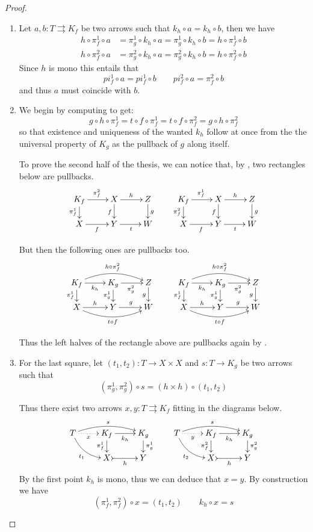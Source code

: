 \documentclass[a4paper,UKenglish,cleveref,pdftex,thm-restate,numberwithinsect]{lipics-v2021}
\begin{document}
\kpp*
\begin{proof}\label{kpp-proof}\begin{enumerate}
		\item Let $a,b\colon T\rightrightarrows K_f$ be two arrows such that $k_h\circ a=k_h\circ b$, then we have
\begin{align*}h\circ \pi^1_f\circ a&=\pi^1_g\circ k_h\circ a=\pi^1_g\circ k_h\circ b=h\circ \pi^1_f\circ b\\
	h\circ \pi^2_f\circ a&=\pi^2_g\circ k_h\circ a=\pi^2_g\circ k_h\circ b=h\circ \pi^2_f\circ b
\end{align*}
Since $h$ is mono this entails that
\[pi^1_f\circ a=pi^1_f\circ b \qquad pi^2_f\circ a=\pi^2_f\circ b\]
and thus $a$ must coincide with $b$.
 
 		\item  We begin by computing to get:
		\[g \circ h \circ \pi_f^1 =  t \circ f \circ \pi_f^1     =  t \circ f \circ \pi_f^2     =  g \circ h \circ \pi_f^2\]
		so that  existence  and uniqueness of the wanted $k_h$ follow at once from the the universal property of $K_g$ as the pullback of $g$ along itself.
		
		To prove the second half of the thesis, we can notice that, by ,  two rectangles below are pullbacks.
		\[\xymatrix@R=15pt{K_f \ar[r]^{\pi^2_f} \ar[d]_{\pi^1_f} & X \ar[r]^{h} \ar[d]_{f} & Z \ar[d]^{g} &  K_f \ar[r]^{\pi^1_f} \ar[d]_{\pi^2_f} & X \ar[r]^{h} \ar[d]_{f} & Z \ar[d]^{g}\\
			X \ar[r]_{f}& Y \ar[r]_{t} & W & X \ar[r]_{f} & Y  \ar[r]_{t}& W}\]
		
		But then the following ones are pullbacks too.
		\[\xymatrix@R=15pt{	K_f  \ar@/^.4cm/[rr]^{h\circ\pi^2_f}\ar[r]_{k_h} \ar[d]_{\pi^1_f}& K_g \ar[d]_{\pi^1_g}  \ar[r]_{\pi^2_g}& Z \ar[d]_{g} & K_f  \ar@/^.4cm/[rr]^{h\circ\pi^2_f}\ar[r]_{k_h} \ar[d]_{\pi^1_f}& K_g \ar[d]_{\pi^1_g}  \ar[r]_{\pi^2_g}& Z \ar[d]_{g} \\
			X \ar[r]^{h} \ar@/_.4cm/[rr]_{t\circ f}& Y \ar[r]^{g} & W & X \ar[r]^{h} \ar@/_.4cm/[rr]_{t\circ f}& Y \ar[r]^{g} & W}\]
		
		Thus the left halves of the rectangle above are pullbacks again by .   
	
		
		\item 		For the last square, let $(t_1, t_2)\colon T\to X\times X$ and $s\colon T\to K_g$ be two arrows such that
		\[(\pi^1_g, \pi^2_g)\circ s=(h\times h)\circ (t_1, t_2)\]
		
		Thus there exist two arrows $x, y\colon T\rightrightarrows K_f$ fitting in the diagrams below.
		\[\xymatrix@R=15pt{T\ar@{.>}[r]_-{x} \ar@/^.3cm/[rr]^{s} \ar@/_.3cm/[dr]_{t_1}& K_f \ar@{->}[r]_{k_h} \ar[d]_{\pi^1_f} & K_g \ar[d]^{\pi^1_g} & T \ar@{.>}[r]_-{y} \ar@/^.3cm/[rr]^{s} \ar@/_.3cm/[dr]_{t_2} & K_f  \ar@{->}[r]_{k_h} \ar[d]_{\pi^2_f}& K_g \ar[d]^{\pi^2_g}\\ & X \ar@{>->}[r]_{h} & Y &&X \ar@{>->}[r]_{h}& Y} \]
		By the first point $k_h$ is mono, thus we can deduce that $x=y$. By construction we have
		\[(\pi^1_f, \pi^2_f)\circ x=(t_1, t_2) \qquad k_h\circ x=s\] 
				

\end{enumerate}
\end{proof}
\end{document}
